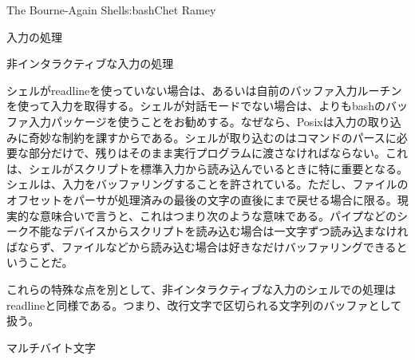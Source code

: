 \begin{aosachapter}{The Bourne-Again Shell}{s:bash}{Chet Ramey}
\begin{aosasect1}{入力の処理}
\begin{aosasect2}{非インタラクティブな入力の処理}

シェルがreadlineを使っていない場合は、あるいは自前のバッファ入力ルーチンを使って入力を取得する。シェルが対話モードでない場合は、よりもbashのバッファ入力パッケージを使うことをお勧めする。なぜなら、Posixは入力の取り込みに奇妙な制約を課すからである。シェルが取り込むのはコマンドのパースに必要な部分だけで、残りはそのまま実行プログラムに渡さなければならない。これは、シェルがスクリプトを標準入力から読み込んでいるときに特に重要となる。シェルは、入力をバッファリングすることを許されている。ただし、ファイルのオフセットをパーサが処理済みの最後の文字の直後にまで戻せる場合に限る。現実的な意味合いで言うと、これはつまり次のような意味である。パイプなどのシーク不能なデバイスからスクリプトを読み込む場合は一文字ずつ読み込まなければならず、ファイルなどから読み込む場合は好きなだけバッファリングできるということだ。

これらの特殊な点を別として、非インタラクティブな入力のシェルでの処理はreadlineと同様である。つまり、改行文字で区切られる文字列のバッファとして扱う。

\end{aosasect2}

\begin{aosasect2}{マルチバイト文字}


\end{aosasect2}
\end{aosasect1}
\end{aosachapter}
